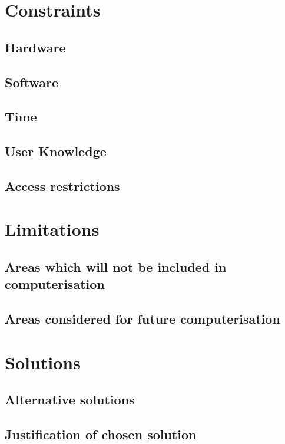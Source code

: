 \section{Constraints}

\subsection{Hardware}

\subsection{Software}

\subsection{Time}

\subsection{User Knowledge}

\subsection{Access restrictions}

\section{Limitations}

\subsection{Areas which will not be included in computerisation}

\subsection{Areas considered for future computerisation}

\section{Solutions}

\subsection{Alternative solutions}

\subsection{Justification of chosen solution}